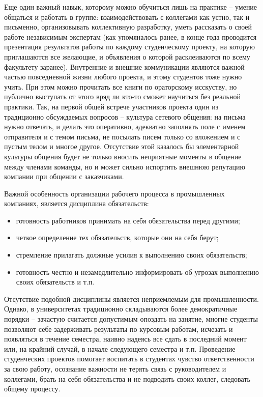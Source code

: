 \documentclass[a5paper]{article}
\begin{document}
Еще один важный навык, которому можно обучиться лишь на практике -- умение общаться и работать в группе: взаимодействовать с коллегами как устно, так и письменно, организовывать коллективную разработку, уметь рассказать о своей работе независимым экспертам (как упомяналось ранее, в конце года проводится презентация результатов работы по каждому студенческому проекту, на которую приглашаются все желающие, и объявления о которой расклеиваются по всему факультету заранее). Внутренние и внешние коммуникации являются важной частью повседневной жизни любого проекта, и этому студентов тоже нужно учить. При этом можно прочитать все книги по ораторскому исскуству, но публично выступать от этого вряд ли кто-то сможет научиться без реальной практики. Так, на первой общей встрече участников проекта один из традиционно обсуждаемых вопросов -- культура сетевого общения: на письма нужно отвечать, и делать это оперативно, адекватно заполнять поле с именем отправителя и с темом письма, не посылать писем только со вложением и с пустым телом и многое другое. Отсутствие этой казалось бы элементарной культуры общения будет не только вносить неприятные моменты в общение между членами команды, но и может сильно испортить внешнюю репутацию компании при общении с заказчиками.

Важной особенность организации рабочего процесса в промышленных компаниях, является дисциплина обязательств:
\begin{itemize}
 \item готовность работников принимать на себя обязательства перед другими;
 \item четкое определение тех обязательств, которые они на себя берут;
 \item стремление прилагать должные усилия к выполнению своих обязательств;
 \item готовность честно и незамедлительно информировать об угрозах выполнению своих обязательств и т.п.
\end{itemize}
Отсутствие подобной дисциплины является неприемлемым для промышленности. Однако, в университетах традиционно складываются более демократичные порядки -- зачастую считается допустимым опоздать на занятие, многие студенты позволяют себе задерживать результаты по курсовым работам, исчезать и появляться в течение семестра, наивно надеясь все сдать в последний момент или, на крайний случай, в начале следующего семестра и т.п. Проведение студенческих проектов помогает воспитать в студентах чувство ответственности за свою работу, осознание важности не терять связь с руководителем и коллегами, брать на себя обязательства и не подводить своих коллег, следовать общему процессу.
\end{document}
